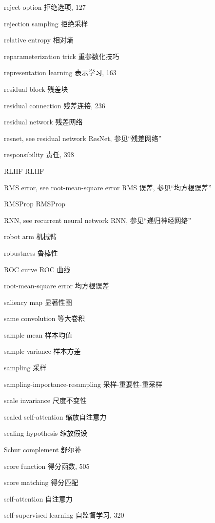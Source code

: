reject option  拒绝选项, 127 \par
rejection sampling  拒绝采样 \par
relative entropy  相对熵 \par
reparameterization trick  重参数化技巧 \par
representation learning  表示学习, 163 \par
residual block  残差块 \par
residual connection  残差连接, 236 \par
residual network  残差网络 \par
resnet, see residual network  ResNet, 参见“残差网络” \par
responsibility  责任, 398 \par
RLHF  RLHF \par
RMS error, see root-mean-square error  RMS 误差, 参见“均方根误差” \par
RMSProp  RMSProp \par
RNN, see recurrent neural network  RNN, 参见“递归神经网络” \par
robot arm  机械臂 \par
robustness  鲁棒性 \par
ROC curve  ROC 曲线 \par
root-mean-square error  均方根误差 \par
saliency map  显著性图 \par
same convolution  等大卷积 \par
sample mean  样本均值 \par
sample variance  样本方差 \par
sampling  采样 \par
sampling-importance-resampling  采样-重要性-重采样 \par
scale invariance  尺度不变性 \par
scaled self-attention  缩放自注意力 \par
scaling hypothesis  缩放假设 \par
Schur complement  舒尔补 \par
score function  得分函数, 505 \par
score matching  得分匹配 \par
self-attention  自注意力 \par
self-supervised learning  自监督学习, 320 \par
